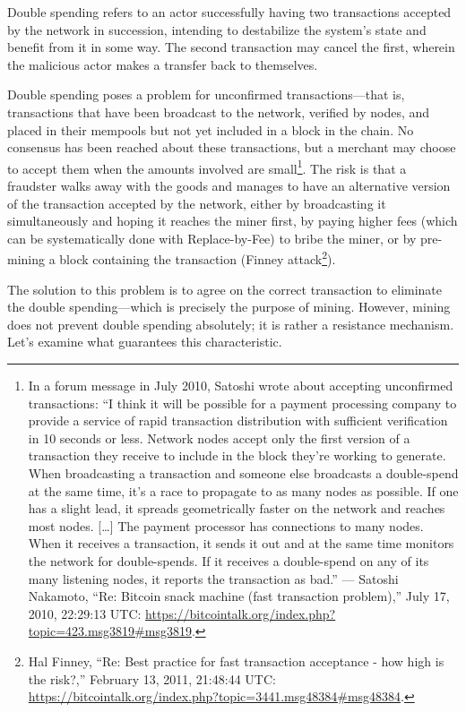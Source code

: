 \documentclass[
  a5paper,
  smalldemyvopaper,10pt,twoside,onecolumn,openright,extrafontsizes,hidelinks]{memoir}
\begin{document}

Double spending refers to an actor successfully having two transactions
accepted by the network in succession, intending to destabilize the
system's state and benefit from it in some way. The second transaction
may cancel the first, wherein the malicious actor makes a transfer back
to themselves.

Double spending poses a problem for unconfirmed transactions---that is,
transactions that have been broadcast to the network, verified by nodes,
and placed in their mempools but not yet included in a block in the
chain. No consensus has been reached about these transactions, but a
merchant may choose to accept them when the amounts involved are
small\footnote{In a forum message in July 2010, Satoshi wrote about
  accepting unconfirmed transactions: ``I think it will be possible for
  a payment processing company to provide a service of rapid transaction
  distribution with sufficient verification in 10 seconds or less.
  Network nodes accept only the first version of a transaction they
  receive to include in the block they're working to generate. When
  broadcasting a transaction and someone else broadcasts a double-spend
  at the same time, it's a race to propagate to as many nodes as
  possible. If one has a slight lead, it spreads geometrically faster on
  the network and reaches most nodes. {[}\ldots{]} The payment processor
  has connections to many nodes. When it receives a transaction, it
  sends it out and at the same time monitors the network for
  double-spends. If it receives a double-spend on any of its many
  listening nodes, it reports the transaction as bad.'' --- Satoshi
  Nakamoto, ``Re: Bitcoin snack machine (fast transaction problem),''
  July 17, 2010, 22:29:13 UTC:
  \url{https://bitcointalk.org/index.php?topic=423.msg3819\#msg3819}.}.
The risk is that a fraudster walks away with the goods and manages to
have an alternative version of the transaction accepted by the network,
either by broadcasting it simultaneously and hoping it reaches the miner
first, by paying higher fees (which can be systematically done with
Replace-by-Fee) to bribe the miner, or by pre-mining a block containing
the transaction (Finney attack\footnote{Hal Finney, ``Re: Best practice
  for fast transaction acceptance - how high is the risk?,'' February
  13, 2011, 21:48:44 UTC:
  \url{https://bitcointalk.org/index.php?topic=3441.msg48384\#msg48384}.}).

The solution to this problem is to agree on the correct transaction to
eliminate the double spending---which is precisely the purpose of
mining. However, mining does not prevent double spending absolutely; it
is rather a resistance mechanism. Let's examine what guarantees this
characteristic.
\end{document}
